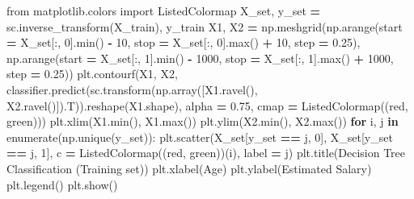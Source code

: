 \documentclass[
]{book}
\newenvironment{Shaded}{\begin{snugshade}}{\end{snugshade}}
\newcommand{\BuiltInTok}[1]{#1}
\newcommand{\ControlFlowTok}[1]{\textcolor[rgb]{0.13,0.29,0.53}{\textbf{#1}}}
\newcommand{\DecValTok}[1]{\textcolor[rgb]{0.00,0.00,0.81}{#1}}
\newcommand{\FloatTok}[1]{\textcolor[rgb]{0.00,0.00,0.81}{#1}}
\newcommand{\ImportTok}[1]{#1}
\newcommand{\KeywordTok}[1]{\textcolor[rgb]{0.13,0.29,0.53}{\textbf{#1}}}
\newcommand{\NormalTok}[1]{#1}
\newcommand{\OperatorTok}[1]{\textcolor[rgb]{0.81,0.36,0.00}{\textbf{#1}}}
\newcommand{\StringTok}[1]{\textcolor[rgb]{0.31,0.60,0.02}{#1}}
\theoremstyle{definition}
\theoremstyle{definition}
\theoremstyle{definition}
\theoremstyle{definition}
\theoremstyle{remark}
\begin{document}
\begin{Shaded}
\begin{Highlighting}[]
\ImportTok{from}\NormalTok{ matplotlib.colors }\ImportTok{import}\NormalTok{ ListedColormap}
\NormalTok{X\_set, y\_set }\OperatorTok{=}\NormalTok{ sc.inverse\_transform(X\_train), y\_train}
\NormalTok{X1, X2 }\OperatorTok{=}\NormalTok{ np.meshgrid(np.arange(start }\OperatorTok{=}\NormalTok{ X\_set[:, }\DecValTok{0}\NormalTok{].}\BuiltInTok{min}\NormalTok{() }\OperatorTok{{-}} \DecValTok{10}\NormalTok{, stop }\OperatorTok{=}\NormalTok{ X\_set[:, }\DecValTok{0}\NormalTok{].}\BuiltInTok{max}\NormalTok{() }\OperatorTok{+} \DecValTok{10}\NormalTok{, step }\OperatorTok{=} \FloatTok{0.25}\NormalTok{),}
\NormalTok{                     np.arange(start }\OperatorTok{=}\NormalTok{ X\_set[:, }\DecValTok{1}\NormalTok{].}\BuiltInTok{min}\NormalTok{() }\OperatorTok{{-}} \DecValTok{1000}\NormalTok{, stop }\OperatorTok{=}\NormalTok{ X\_set[:, }\DecValTok{1}\NormalTok{].}\BuiltInTok{max}\NormalTok{() }\OperatorTok{+} \DecValTok{1000}\NormalTok{, step }\OperatorTok{=} \FloatTok{0.25}\NormalTok{))}
\NormalTok{plt.contourf(X1, X2, classifier.predict(sc.transform(np.array([X1.ravel(), X2.ravel()]).T)).reshape(X1.shape),}
\NormalTok{             alpha }\OperatorTok{=} \FloatTok{0.75}\NormalTok{, cmap }\OperatorTok{=}\NormalTok{ ListedColormap((}\StringTok{\textquotesingle{}red\textquotesingle{}}\NormalTok{, }\StringTok{\textquotesingle{}green\textquotesingle{}}\NormalTok{)))}
\NormalTok{plt.xlim(X1.}\BuiltInTok{min}\NormalTok{(), X1.}\BuiltInTok{max}\NormalTok{())}
\NormalTok{plt.ylim(X2.}\BuiltInTok{min}\NormalTok{(), X2.}\BuiltInTok{max}\NormalTok{())}
\ControlFlowTok{for}\NormalTok{ i, j }\KeywordTok{in} \BuiltInTok{enumerate}\NormalTok{(np.unique(y\_set)):}
\NormalTok{    plt.scatter(X\_set[y\_set }\OperatorTok{==}\NormalTok{ j, }\DecValTok{0}\NormalTok{], X\_set[y\_set }\OperatorTok{==}\NormalTok{ j, }\DecValTok{1}\NormalTok{], c }\OperatorTok{=}\NormalTok{ ListedColormap((}\StringTok{\textquotesingle{}red\textquotesingle{}}\NormalTok{, }\StringTok{\textquotesingle{}green\textquotesingle{}}\NormalTok{))(i), label }\OperatorTok{=}\NormalTok{ j)}
\NormalTok{plt.title(}\StringTok{\textquotesingle{}Decision Tree Classification (Training set)\textquotesingle{}}\NormalTok{)}
\NormalTok{plt.xlabel(}\StringTok{\textquotesingle{}Age\textquotesingle{}}\NormalTok{)}
\NormalTok{plt.ylabel(}\StringTok{\textquotesingle{}Estimated Salary\textquotesingle{}}\NormalTok{)}
\NormalTok{plt.legend()}
\NormalTok{plt.show()}
\end{Highlighting}
\end{Shaded}
\end{document}
